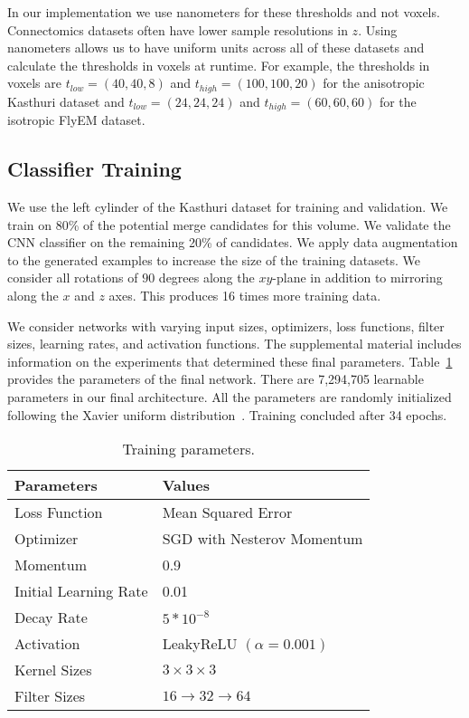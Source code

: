 In our implementation we use nanometers for these thresholds and not voxels. Connectomics datasets often have lower sample resolutions in $z$. Using nanometers allows us to have uniform units across all of these datasets and calculate the thresholds in voxels at runtime. For example, the thresholds in voxels are $t_{low} = (40, 40, 8)$ and $t_{high} = (100, 100, 20)$ for the anisotropic Kasthuri dataset and $t_{low} = (24, 24, 24)$ and $t_{high} = (60, 60, 60)$ for the isotropic FlyEM dataset.


\subsection{Classifier Training}
\label{sec:network-parameters}

We use the left cylinder of the Kasthuri dataset for training and validation. We train on 80\% of the potential merge candidates for this volume.
We validate the CNN classifier on the remaining 20\% of candidates. We apply data augmentation to the generated examples to increase the size of the training datasets. We consider all rotations of $90$ degrees along the $xy$-plane in addition to mirroring along the $x$ and $z$ axes. This produces 16 times more training data.

We consider networks with varying input sizes, optimizers, loss functions, filter sizes, learning rates, and activation functions. The supplemental material includes information on the experiments that determined these final parameters. Table~\ref{table:architecture} provides the parameters of the final network. There are 7,294,705 learnable parameters in our final architecture. All the parameters are randomly initialized following the Xavier uniform distribution~\cite{glorot2010understanding}. Training concluded after 34 epochs.

\begin{table}[h!]
	\centering
	\begin{tabular}{l l} \hline
		\textbf{Parameters} & \textbf{Values} \\ \hline
		Loss Function & Mean Squared Error \\
		Optimizer & SGD  with Nesterov Momentum \\
		Momentum & 0.9 \\
		Initial Learning Rate & 0.01 \\
		Decay Rate & $5 * 10^{-8}$ \\
		Activation & LeakyReLU $(\alpha = 0.001)$ \\
		Kernel Sizes & $3 \times 3 \times 3$ \\
		Filter Sizes & $16 \to 32 \to 64$ \\ \hline
	\end{tabular}
	\caption{Training parameters.}
	\label{table:architecture}
\end{table}





